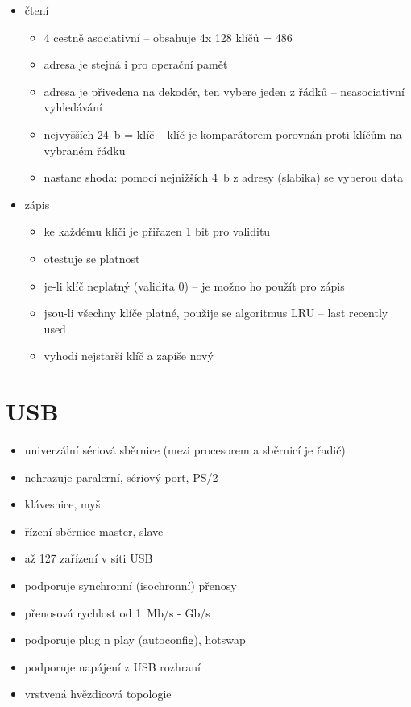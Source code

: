 \documentclass[a4paper,12pt]{article}
\providecommand{\tightlist}{%
\setlength{\itemsep}{0pt}\setlength{\parskip}{0pt}}
\begin{document}
\begin{itemize}
  \tightlist
  \item čtení
  \begin{itemize}
    \tightlist
    \item 4 cestně asociativní -- obsahuje 4x 128 klíčů = 486
    \item adresa je stejná i pro operační paměť
    \item adresa je přivedena na dekodér, ten vybere jeden z řádků --
    neasociativní vyhledávání
    \item nejvyšších 24~b = klíč -- klíč je komparátorem porovnán proti klíčům
    na vybraném řádku
    \item nastane shoda: pomocí nejnižších 4~b z adresy (slabika) se vyberou data
  \end{itemize}
  \item zápis
  \begin{itemize}
    \tightlist
    \item ke každému klíči je přiřazen 1 bit pro validitu
    \item otestuje se platnost
    \item je-li klíč neplatný (validita 0) -- je možno ho použít pro zápis
    \item jsou-li všechny klíče platné, použije se algoritmus LRU -- last
    recently used
    \item vyhodí nejstarší klíč a zapíše nový
  \end{itemize}
\end{itemize}

\section{USB}

\begin{itemize}
  \item univerzální sériová sběrnice (mezi procesorem a sběrnicí je řadič)
  \item nehrazuje paralerní, sériový port, PS/2
  \item klávesnice, myš
  \item řízení sběrnice master, slave
  \item až 127 zařízení v síti USB
  \item podporuje synchronní (isochronní) přenosy
  \item přenosová rychlost od 1~Mb/s - Gb/s
  \item podporuje plug n play (autoconfig), hotswap
  \item podporuje napájení z USB rozhraní
  \item vrstvená hvězdicová topologie
\end{itemize}
\end{document}

